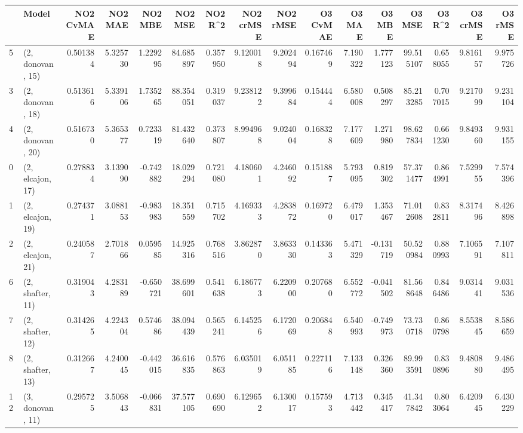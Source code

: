 \begin{tabular}{llrrrrrrrrrrrrrr}
\toprule
{} &             Model &  NO2 CvMAE &   NO2 MAE &   NO2 MBE &    NO2 MSE &   NO2 R\textasciicircum2 &  NO2 crMSE &  NO2 rMSE &  O3 CvMAE &     O3 MAE &    O3 MBE &      O3 MSE &    O3 R\textasciicircum2 &   O3 crMSE &    O3 rMSE \\
\midrule
5  &  (2, donovan, 15) &   0.501384 &  5.325730 &  1.229295 &  84.685897 &  0.357950 &   9.120018 &  9.202494 &  0.167469 &   7.190322 &  1.777123 &   99.515107 &  0.658055 &   9.816157 &   9.975726 \\
3  &  (2, donovan, 18) &   0.513616 &  5.339106 &  1.735265 &  88.354051 &  0.319037 &   9.238122 &  9.399684 &  0.154444 &   6.580008 &  0.508297 &   85.213285 &  0.707015 &   9.217099 &   9.231104 \\
4  &  (2, donovan, 20) &   0.516730 &  5.365377 &  0.723319 &  81.432640 &  0.373807 &   8.994968 &  9.024004 &  0.168328 &   7.177609 &  1.271980 &   98.627834 &  0.661230 &   9.849360 &   9.931155 \\
0  &  (2, elcajon, 17) &   0.278834 &  3.139090 & -0.742882 &  18.029294 &  0.721080 &   4.180601 &  4.246092 &  0.151887 &   5.793095 &  0.819302 &   57.371477 &  0.864991 &   7.529955 &   7.574396 \\
1  &  (2, elcajon, 19) &   0.274371 &  3.088153 & -0.983983 &  18.351559 &  0.715702 &   4.169333 &  4.283872 &  0.169720 &   6.479017 &  1.353467 &   71.012608 &  0.832811 &   8.317496 &   8.426898 \\
2  &  (2, elcajon, 21) &   0.240587 &  2.701866 &  0.059585 &  14.925316 &  0.768516 &   3.862870 &  3.863330 &  0.143363 &   5.471329 & -0.131719 &   50.520984 &  0.880993 &   7.106591 &   7.107811 \\
6  &  (2, shafter, 11) &   0.319043 &  4.283189 & -0.650721 &  38.699601 &  0.541638 &   6.186773 &  6.220900 &  0.207680 &   6.552772 & -0.041502 &   81.568648 &  0.846486 &   9.031441 &   9.031536 \\
7  &  (2, shafter, 12) &   0.314265 &  4.224304 &  0.574686 &  38.094439 &  0.565241 &   6.145256 &  6.172069 &  0.206848 &   6.540993 & -0.749973 &   73.730718 &  0.860798 &   8.553845 &   8.586659 \\
8  &  (2, shafter, 13) &   0.312667 &  4.240045 & -0.442015 &  36.616835 &  0.576863 &   6.035019 &  6.051185 &  0.227116 &   7.133148 &  0.326360 &   89.993591 &  0.830896 &   9.480880 &   9.486495 \\
12 &  (3, donovan, 11) &   0.295725 &  3.506843 & -0.066831 &  37.577105 &  0.690690 &   6.129652 &  6.130017 &  0.157593 &   4.713442 &  0.345417 &   41.347842 &  0.803064 &   6.420945 &   6.430229 \\

\end{tabular}
